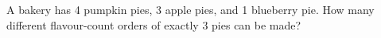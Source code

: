 A bakery has 4 pumpkin pies, 3 apple pies, and 1 blueberry pie. How many different flavour-count orders of exactly 3 pies can be made?

